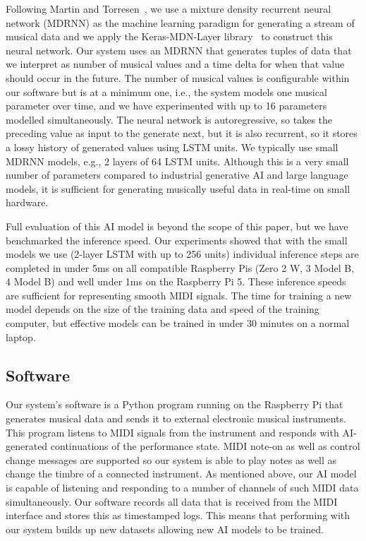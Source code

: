 \documentclass[manuscript,review,anonymous]{acmart}
\begin{document}
Following Martin and Torresen~\cite{Martin2019}, we use a mixture density recurrent neural network (MDRNN) as the machine learning paradigm for generating a stream of musical data and we apply the Keras-MDN-Layer library~\cite{keras-mdn-layer} to construct this neural network.
Our system uses an MDRNN that generates tuples of data that we interpret as number of musical values and a time delta for when that value should occur in the future. 
The number of musical values is configurable within our software but is at a minimum one, i.e., the system models one musical parameter over time, and we have experimented with up to 16 parameters modelled simultaneously.
The neural network is autoregressive, so takes the preceding value as input to the generate next, but it is also recurrent, so it stores a lossy history of generated values using LSTM units. 
We typically use small MDRNN models, e.g., 2 layers of 64 LSTM units.
Although this is a very small number of parameters compared to industrial generative AI and large language models, it is sufficient for generating musically useful data in real-time on small hardware.

Full evaluation of this AI model is beyond the scope of this paper, but we have benchmarked the inference speed. Our experiments showed that with the small models we use (2-layer LSTM with up to 256 units) individual inference steps are completed in under 5ms on all compatible Raspberry Pis (Zero 2 W, 3 Model B, 4 Model B) and well under 1ms on the Raspberry Pi 5. These inference speeds are sufficient for representing smooth MIDI signals. The time for training a new model depends on the size of the training data and speed of the training computer, but effective models can be trained in under 30 minutes on a normal laptop.



\subsection{Software}

Our system's software is a Python program running on the Raspberry Pi that generates musical data and sends it to external electronic musical instruments.
This program listens to MIDI signals from the instrument and responds with AI-generated continuations of the performance state.
MIDI note-on as well as control change messages are supported so our system is able to play notes as well as change the timbre of a connected instrument.
As mentioned above, our AI model is capable of listening and responding to a number of channels of such MIDI data simultaneously.
Our software records all data that is received from the MIDI interface and stores this as timestamped logs. This means that performing with our system builds up new datasets allowing new AI models to be trained.
\end{document}
